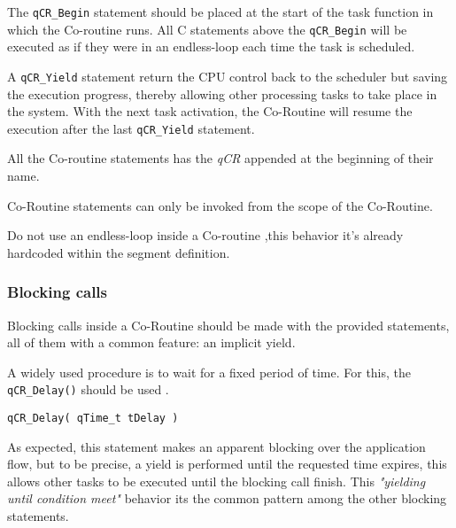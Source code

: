   

The \lstinline{qCR_Begin} statement should be placed at the start of the task function in which the Co-routine runs. All C statements above the \lstinline{qCR_Begin} will be executed as if they were in an endless-loop each time the task is scheduled.

A \lstinline{qCR_Yield}  statement return the CPU control back to the scheduler but saving the execution progress, thereby allowing other processing tasks to take place in the system. With the next task activation, the Co-Routine will resume the execution after the last \lstinline{qCR_Yield} statement.
\medskip

\begin{tcolorbox}
\HandRight All the Co-routine statements has the \textit{qCR} appended at the beginning of their name.
\end{tcolorbox}

\begin{tcolorbox}
\HandRight Co-Routine statements can only be invoked from the scope of the Co-Routine.
\end{tcolorbox}


\begin{tcolorbox}
\HandRight Do not use an endless-loop inside a Co-routine ,this behavior it's already hardcoded within the segment definition.
\end{tcolorbox}

\subsubsection{Blocking calls}
Blocking calls inside a Co-Routine should be made with the provided statements, all of them with a common feature: an implicit yield.

A widely used procedure is to wait for a fixed period of time. For this, the \lstinline{qCR_Delay()} should be used . 
\medskip


\begin{lstlisting}[style=CStyle]
qCR_Delay( qTime_t tDelay ) 
\end{lstlisting}

As expected, this statement makes an apparent blocking over the application flow, but to be precise, a yield is performed until the requested time expires, this allows other tasks to be executed until the blocking call finish. This \textit{"yielding until condition meet"} behavior its the common pattern among the other blocking statements.
\medskip

